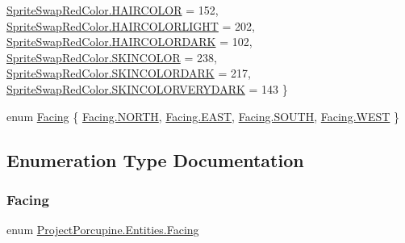 \begin{DoxyCompactItemize}
\hyperlink{namespace_project_porcupine_1_1_entities_a72645721e1c0d9a355d63dad026dfcd9a2f51f84a920adaa8e9ac27b4f2e24780}{Sprite\+Swap\+Red\+Color.\+H\+A\+I\+R\+C\+O\+L\+OR} = 152, 
\hyperlink{namespace_project_porcupine_1_1_entities_a72645721e1c0d9a355d63dad026dfcd9a11ae439aa8b8be9054acc061b8cf345e}{Sprite\+Swap\+Red\+Color.\+H\+A\+I\+R\+C\+O\+L\+O\+R\+L\+I\+G\+HT} = 202, 
\newline
\hyperlink{namespace_project_porcupine_1_1_entities_a72645721e1c0d9a355d63dad026dfcd9aedcdb1ce81a98f7900c3b84f89820e41}{Sprite\+Swap\+Red\+Color.\+H\+A\+I\+R\+C\+O\+L\+O\+R\+D\+A\+RK} = 102, 
\hyperlink{namespace_project_porcupine_1_1_entities_a72645721e1c0d9a355d63dad026dfcd9a8d3443f7cb2f9bb62b7b8e417a10675a}{Sprite\+Swap\+Red\+Color.\+S\+K\+I\+N\+C\+O\+L\+OR} = 238, 
\hyperlink{namespace_project_porcupine_1_1_entities_a72645721e1c0d9a355d63dad026dfcd9ae6f35cadc83fa83d9b84685c37edb75c}{Sprite\+Swap\+Red\+Color.\+S\+K\+I\+N\+C\+O\+L\+O\+R\+D\+A\+RK} = 217, 
\hyperlink{namespace_project_porcupine_1_1_entities_a72645721e1c0d9a355d63dad026dfcd9a9d633aa37829f17dd1d21a7005ea0495}{Sprite\+Swap\+Red\+Color.\+S\+K\+I\+N\+C\+O\+L\+O\+R\+V\+E\+R\+Y\+D\+A\+RK} = 143
 \}
\item 
enum \hyperlink{namespace_project_porcupine_1_1_entities_a91ebf8b2a3a0315adf5da6e882862808}{Facing} \{ \hyperlink{namespace_project_porcupine_1_1_entities_a91ebf8b2a3a0315adf5da6e882862808a2bf8f791695c70efa9c14e6f1c326403}{Facing.\+N\+O\+R\+TH}, 
\hyperlink{namespace_project_porcupine_1_1_entities_a91ebf8b2a3a0315adf5da6e882862808a45ac78bf3d4882ac520f4e7fb08d55c5}{Facing.\+E\+A\+ST}, 
\hyperlink{namespace_project_porcupine_1_1_entities_a91ebf8b2a3a0315adf5da6e882862808a96e44fa82e5a5263fb92337be422d3eb}{Facing.\+S\+O\+U\+TH}, 
\hyperlink{namespace_project_porcupine_1_1_entities_a91ebf8b2a3a0315adf5da6e882862808a83c9f5692281bf59471b13dfddb3af91}{Facing.\+W\+E\+ST}
 \}
\end{DoxyCompactItemize}


\subsection{Enumeration Type Documentation}
\mbox{\label{namespace_project_porcupine_1_1_entities_a91ebf8b2a3a0315adf5da6e882862808}} 
\subsubsection{\texorpdfstring{Facing}{Facing}}
{\footnotesize\ttfamily enum \hyperlink{namespace_project_porcupine_1_1_entities_a91ebf8b2a3a0315adf5da6e882862808}{Project\+Porcupine.\+Entities.\+Facing}\hspace{0.3cm}{\ttfamily [strong]}}

